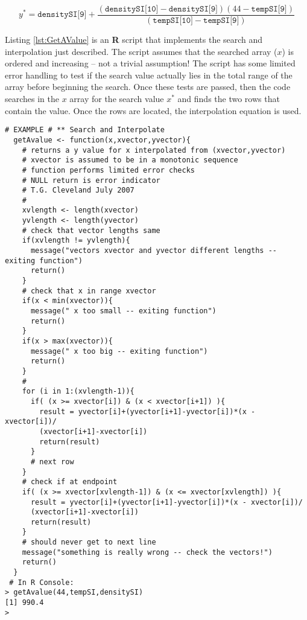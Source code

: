 \begin{equation}
y^*=\texttt{densitySI[9]}+\frac{(\texttt{densitySI[10]}-\texttt{densitySI[9]})(44-\texttt{tempSI[9]})}{(\texttt{tempSI[10]}-\texttt{tempSI[9]})}
\label{eqn:InterpolationArrayEquation}
\end{equation}

Listing \ref{lst:GetAValue} is an \textbf{R} script that implements the search and interpolation just described.  The script assumes that the searched array ($x$) is ordered and increasing -- not a trivial assumption!  The script has some limited error handling to test if the search value actually lies in the total range of the array before beginning the search.  Once these tests are passed, then the code searches in the $x$ array for the search value $x^*$ and finds the two rows that contain the value.  Once the rows are located, the interpolation equation is used.

\begin{lstlisting}[caption=R code to Search and Interpolate, label=lst:GetAValue]
# EXAMPLE # ** Search and Interpolate
  getAvalue <- function(x,xvector,yvector){
    # returns a y value for x interpolated from (xvector,yvector)
    # xvector is assumed to be in a monotonic sequence
    # function performs limited error checks
    # NULL return is error indicator
    # T.G. Cleveland July 2007 
    #
    xvlength <- length(xvector)
    yvlength <- length(yvector)
    # check that vector lengths same
    if(xvlength != yvlength){
      message("vectors xvector and yvector different lengths -- exiting function")
      return()
    }
    # check that x in range xvector
    if(x < min(xvector)){
      message(" x too small -- exiting function")
      return()
    }
    if(x > max(xvector)){
      message(" x too big -- exiting function")
      return()
    }
    #
    for (i in 1:(xvlength-1)){
      if( (x >= xvector[i]) & (x < xvector[i+1]) ){
        result = yvector[i]+(yvector[i+1]-yvector[i])*(x - xvector[i])/
        (xvector[i+1]-xvector[i])
        return(result)
      }
      # next row  
    }
    # check if at endpoint
    if( (x >= xvector[xvlength-1]) & (x <= xvector[xvlength]) ){
      result = yvector[i]+(yvector[i+1]-yvector[i])*(x - xvector[i])/
      (xvector[i+1]-xvector[i])
      return(result)
    }
    # should never get to next line
    message("something is really wrong -- check the vectors!")
    return()
  }
 # In R Console:  
> getAvalue(44,tempSI,densitySI)
[1] 990.4
> 
  \end{lstlisting}  

